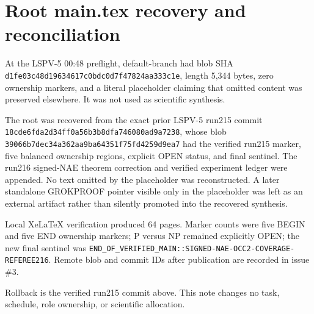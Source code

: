 \documentclass[11pt]{article}
\begin{document}
\section*{Root main.tex recovery and reconciliation}

At the LSPV-5 00:48 preflight, default-branch  had blob SHA
\texttt{d1fe03c48d19634617c0bdc0d7f47824aa333c1e}, length 5,344 bytes, zero
ownership markers, and a literal placeholder claiming that omitted content
was preserved elsewhere.  It was not used as scientific synthesis.

The root was recovered from the exact prior LSPV-5 run215 commit
\texttt{18cde6fda2d34ff0a56b3b8dfa746080ad9a7238}, whose  blob
\texttt{39066b7dec34a362aa9ba64351f75fd4259d9ea7} had the verified run215 marker,
five balanced ownership regions, explicit OPEN status, and final sentinel.
The run216 signed-NAE theorem correction and verified experiment ledger were
appended.  No text omitted by the placeholder was reconstructed.  A later
standalone GROKPROOF pointer visible only in the placeholder was left as an
external artifact rather than silently promoted into the recovered synthesis.

Local XeLaTeX verification produced 64 pages.  Marker counts were five BEGIN
and five END ownership markers; P versus NP remained explicitly OPEN; the
new final sentinel was
\texttt{END\_OF\_VERIFIED\_MAIN::SIGNED-NAE-OCC2-COVERAGE-REFEREE216}.
Remote blob and commit IDs after publication are recorded in issue \#3.

Rollback is the verified run215 commit above.  This note changes no task,
schedule, role ownership, or scientific allocation.

\end{document}

